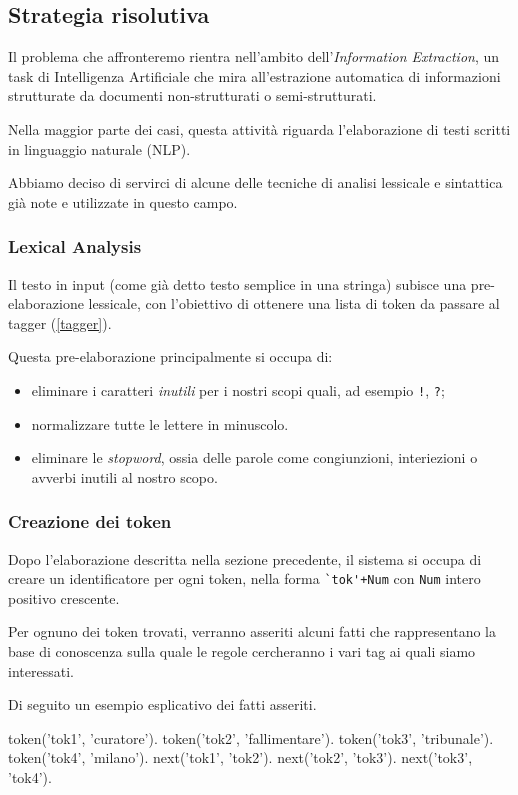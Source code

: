 \subsection{Strategia risolutiva}
Il problema che affronteremo rientra nell'ambito dell'\emph{Information Extraction}, un task di Intelligenza Artificiale che mira all'estrazione automatica di informazioni strutturate da documenti non-strutturati o semi-strutturati.

Nella maggior parte dei casi, questa attività riguarda l'elaborazione di testi scritti in linguaggio naturale (NLP).

Abbiamo deciso di servirci di alcune delle tecniche di analisi lessicale e sintattica già note e utilizzate in questo campo.

\subsubsection{Lexical Analysis}
Il testo in input (come già detto testo semplice in una stringa) subisce una pre-elaborazione lessicale, con l'obiettivo di ottenere una lista di token da passare al tagger (\ref{tagger}).

Questa pre-elaborazione principalmente si occupa di:
\begin{itemize}
\item eliminare i caratteri \emph{inutili} per i nostri scopi quali, ad esempio \verb+!+, \verb+?+;
\item normalizzare tutte le lettere in minuscolo.
\item eliminare le \emph{stopword}, ossia delle parole come congiunzioni, interiezioni o avverbi inutili al nostro scopo.
\end{itemize}


\subsubsection{Creazione dei token}
Dopo l'elaborazione descritta nella sezione precedente, il sistema si occupa di creare un identificatore per ogni token, nella forma \verb:`tok'+Num: con \verb+Num+ intero positivo crescente.

Per ognuno dei token trovati, verranno asseriti alcuni fatti che rappresentano la base di conoscenza sulla quale le regole cercheranno i vari tag ai quali siamo interessati.

Di seguito un esempio esplicativo dei fatti asseriti.

\begin{prologcode}
token('tok1', 'curatore').
token('tok2', 'fallimentare').
token('tok3', 'tribunale').
token('tok4', 'milano').
next('tok1', 'tok2').
next('tok2', 'tok3').
next('tok3', 'tok4').
\end{prologcode}

